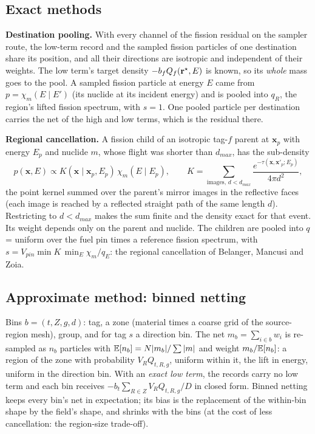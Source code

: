 \subsection{Exact methods}

\textbf{Destination pooling.} With every channel of the fission residual on the sampler route, the
low-term record and the sampled fission particles of one destination share its position, and all
their directions are isotropic and independent of their weights. The low term's target density
$-b_fQ_f(\mathbf r^\star,E)$ is known, so its \emph{whole} mass goes to the pool. A sampled fission
particle at energy $E$ came from $p=\chi_m(E\mid E')$ (its nuclide at its incident energy) and is
pooled into $q_R$, the region's lifted fission spectrum, with $s=1$. One pooled particle per
destination carries the net of the high and low terms, which is the residual there.

\textbf{Regional cancellation.} A fission child of an isotropic tag-$f$ parent at $\mathbf x_p$ with
energy $E_p$ and nuclide $m$, whose flight was shorter than $d_{max}$, has the sub-density
\begin{equation}
p(\mathbf x,E)\propto K(\mathbf x\mid\mathbf x_p,E_p)\,\chi_m(E\mid E_p),\qquad
K=\sum_{\text{images},\,d<d_{max}}\frac{e^{-\tau(\mathbf x,\mathbf x'_p;E_p)}}{4\pi d^2},
\end{equation}
the point kernel summed over the parent's mirror images in the reflective faces (each image is
reached by a reflected straight path of the same length $d$). Restricting to $d<d_{max}$ makes the
sum finite and the density exact for that event. Its weight depends only on the parent and nuclide.
The children are pooled into $q$ = uniform over the fuel pin times a reference fission spectrum, with
$s=V_{pin}\min K\,\min_E\chi_m/q_E$: the regional cancellation of Belanger, Mancusi and Zoia.

\subsection{Approximate method: binned netting}

Bins $b=(t,Z,g,d)$: tag, a zone (material times a coarse grid of the source-region mesh), group,
and for tag $s$ a direction bin. The net $m_b=\sum_{i\in b}w_i$ is re-sampled as $n_b$ particles with
$\mathbb E[n_b]=N|m_b|/\sum|m|$ and weight $m_b/\mathbb E[n_b]$: a region of the zone with probability
$V_RQ_{t,R,g}$, uniform within it, the lift in energy, uniform in the direction bin. With an
\emph{exact low term}, the records carry no low term and each bin receives
$-b_t\sum_{R\in Z}V_RQ_{t,R,g}/D$ in closed form. Binned netting keeps every bin's net in expectation;
its bias is the replacement of the within-bin shape by the field's shape, and shrinks with the bins
(at the cost of less cancellation: the region-size trade-off).

